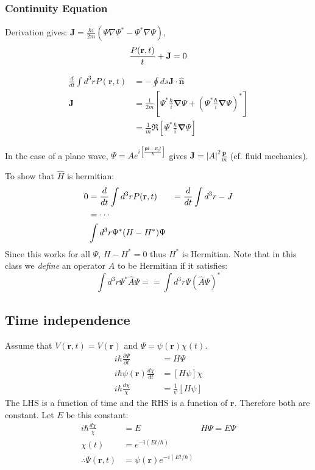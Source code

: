 \documentclass[11pt]{article}
\newcommand{\vnabla}{\vec\nabla}
\renewcommand{\vec}[1]{\mathbf{#1}}
\newcommand{\hv}[1]{\hat{\mathbf{#1}}}
\newcommand{\FR}[2]{\frac{#1}{#2}}
\newcommand{\PP}[2]{\frac{\partial #1}{\partial #2}}
\newcommand{\LL}{\left}
\newcommand{\RR}{\right}
\theoremstyle{plain}
\theoremstyle{definition}
\theoremstyle{remark}
\let\div\relax
\DeclareMathOperator{\div}{div}
\begin{document}
\subsubsection{Continuity Equation}
Derivation gives: 
$\vec J = \FR{\hbar i}{2m} (\Psi\nabla\Psi^* - \Psi^*\nabla\Psi)$,
\[\FR{P(\vec r,t)}{t} + \div\vec J = 0\]

\begin{align*}
\FR{d}{dt}\int d^3 r P(\vec r,t) &= - \oint ds \vec J \cdot \hv n\\
\vec J &= \FR{1}{2m}\LL[ \Psi^* \FR{\hbar}{i} \vnabla \Psi
+(\Psi^*\FR{\hbar}{i} \vnabla \Psi)^*\RR]\\
&= \FR{1}{m}\Re\LL[\Psi^*\FR{\hbar}{i} \vnabla \Psi\RR]
\end{align*}

In the case of a plane wave, $\Psi = 
A e^{i \LL[ \FR{\vec p\vec r - E_p t}{\hbar}\RR]}$ gives
$\vec J = |A|^2 \FR{\vec p}{m}$ (cf. fluid mechanics).

To show that $\hat H$ is hermitian:
\begin{align*}
0 &= \FR{d}{dt} \int d^3 r P(\vec r,t)
&= \FR{d}{dt} \int d^3 r -\div J\\
&= \cdots\\
&\int d^3 r \Psi^*(H-H^*)\Psi
\end{align*}
Since this works for all $\Psi$, $H-H^* = 0$ thus $H^*$ is
Hermitian. Note that in this class we \emph{define}
an operator $A$ to be Hermitian if it satisfies:
\[ \int d^3 r \Psi^* \hat A \Psi =
 = \int d^3 r \Psi (\hat A \Psi)^* \]

\subsection{Time independence}
Assume that $V(\vec r,t) = V(\vec r)$ and $\Psi = \psi(\vec r)\chi(t)$.
\begin{align*}
i\hbar \PP{\Psi}{t} &= H\Psi\\
i\hbar \psi(\vec r)\FR{d\chi}{dt} &= [H\psi]\chi\\
i\hbar \FR{d\chi}{\chi} &= \FR{1}{\psi}[H\psi]
\end{align*}
The LHS is a function of time and the RHS is a function of $\vec r$.
Therefore both are constant. Let $E$ be this constant:
\begin{align*}
i\hbar \FR{d\chi}{\chi} &= E & H\Psi = E\Psi\\
\chi(t) &= e^{-i (Et/\hbar)}&\\
    \therefore \Psi(\vec r,t) &= \psi(\vec r)e^{-i(Et/\hbar)}
\end{align*}
\end{document}
